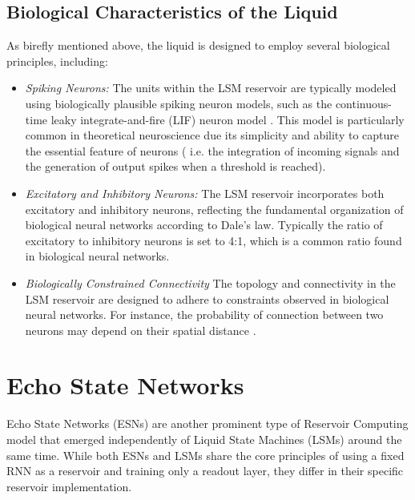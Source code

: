 \documentclass[a4paper,12pt]{report}
\begin{document}
\subsection*{Biological Characteristics of the Liquid}
As birefly mentioned above, the liquid is designed to employ several biological principles,
including:
\begin{itemize}
  \item \emph{Spiking Neurons:}
    The units within the LSM reservoir are typically modeled using biologically plausible 
    spiking neuron models, such as the continuous-time leaky integrate-and-fire (LIF) 
    neuron model \cite{TANAKA2019100}. 
    This model is particularly common in theoretical neuroscience
    due its simplicity and ability to capture the essential feature of neurons (
    i.e. the integration of incoming signals and the generation of output 
    spikes when a threshold is reached). 
  \item \emph{Excitatory and Inhibitory Neurons:}
    The LSM reservoir incorporates both excitatory and inhibitory neurons, reflecting 
    the fundamental organization of biological neural networks according to Dale's law.
    Typically the ratio of excitatory to inhibitory neurons is set to 4:1, which is a
    common ratio found in biological neural networks.
  \item \emph{Biologically Constrained Connectivity}
    The topology and connectivity in the LSM reservoir are designed to adhere to 
    constraints observed in biological neural networks. For instance, the probability 
    of connection between two neurons may depend on their spatial distance 
    \cite{TANAKA2019100}.
\end{itemize}

\section{Echo State Networks}

Echo State Networks (ESNs) are another prominent type of Reservoir Computing model that 
emerged independently of Liquid State Machines (LSMs) around the same time. While both 
ESNs and LSMs share the core principles of using a fixed RNN as a 
reservoir and training only a readout layer, they differ in their specific reservoir 
implementation.
\end{document}

